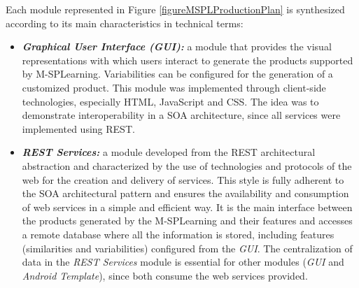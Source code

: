 Each module represented in Figure \ref{figureMSPLProductionPlan} is synthesized according to its main characteristics in technical terms:

\begin{itemize}
	\item \textbf{\textit{Graphical User Interface (GUI):}} a module that provides the visual representations with which users interact to generate the products supported by M-SPLearning. Variabilities can be configured for the generation of a customized product. This module was implemented through client-side technologies, especially HTML, JavaScript and CSS. The idea was to demonstrate interoperability in a SOA architecture, since all services were implemented using REST.
	
	\item \textbf{\textit{REST Services:}} a module developed from the REST architectural abstraction and characterized by the use of technologies and protocols of the web for the creation and delivery of services. This style is fully adherent to the SOA architectural pattern and ensures the availability and consumption of web services in a simple and efficient way. It is the main interface between the products generated by the M-SPLearning and their features and accesses a remote database where all the information is stored, including features (similarities and variabilities) configured from the \textit{GUI}. The centralization of data in the \textit{REST Services} module is essential for other modules (\textit{GUI} and \textit{Android Template}), since both consume the web services provided.
	

\end{itemize}
